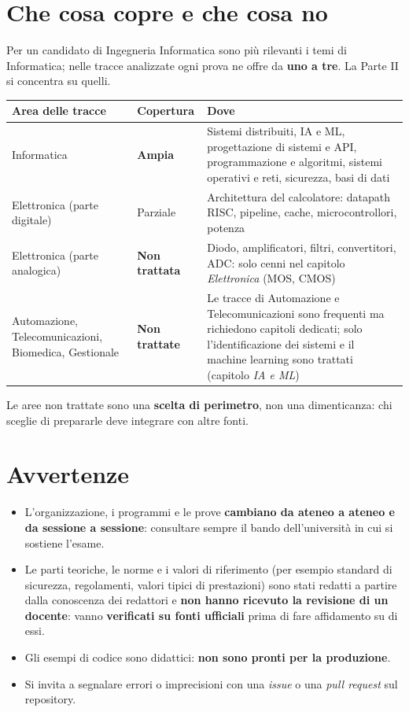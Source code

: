 \section*{Che cosa copre e che cosa no}
Per un candidato di Ingegneria Informatica sono più rilevanti i temi di Informatica; nelle tracce analizzate ogni prova ne offre da \textbf{uno a tre}. La Parte II si concentra su quelli.

\begin{center}
\small
\begin{tabularx}{\textwidth}{@{}>{\raggedright\arraybackslash}p{3.1cm}>{\raggedright\arraybackslash}p{3cm}X@{}}
\toprule
\textbf{Area delle tracce} & \textbf{Copertura} & \textbf{Dove} \\
\midrule
Informatica & \textbf{Ampia} & Sistemi distribuiti, IA e ML, progettazione di sistemi e API, programmazione e algoritmi, sistemi operativi e reti, sicurezza, basi di dati \\
Elettronica (parte digitale) & Parziale & Architettura del calcolatore: datapath RISC, pipeline, cache, microcontrollori, potenza \\
Elettronica (parte analogica) & \textbf{Non trattata} & Diodo, amplificatori, filtri, convertitori, ADC: solo cenni nel capitolo \emph{Elettronica} (MOS, CMOS) \\
Automazione, Telecomunicazioni, Biomedica, Gestionale & \textbf{Non trattate} & Le tracce di Automazione e Telecomunicazioni sono frequenti ma richiedono capitoli dedicati; solo l'identificazione dei sistemi e il machine learning sono trattati (capitolo \emph{IA e ML}) \\
\bottomrule
\end{tabularx}
\end{center}
Le aree non trattate sono una \textbf{scelta di perimetro}, non una dimenticanza: chi sceglie di prepararle deve integrare con altre fonti.

\section*{Avvertenze}
\begin{itemize}
    \item L'organizzazione, i programmi e le prove \textbf{cambiano da ateneo a ateneo e da sessione a sessione}: consultare sempre il bando dell'università in cui si sostiene l'esame.
    \item Le parti teoriche, le norme e i valori di riferimento (per esempio standard di sicurezza, regolamenti, valori tipici di prestazioni) sono stati redatti a partire dalla conoscenza dei redattori e \textbf{non hanno ricevuto la revisione di un docente}: vanno \textbf{verificati su fonti ufficiali} prima di fare affidamento su di essi.
    \item Gli esempi di codice sono didattici: \textbf{non sono pronti per la produzione}.
    \item Si invita a segnalare errori o imprecisioni con una \emph{issue} o una \emph{pull request} sul repository.
\end{itemize}
